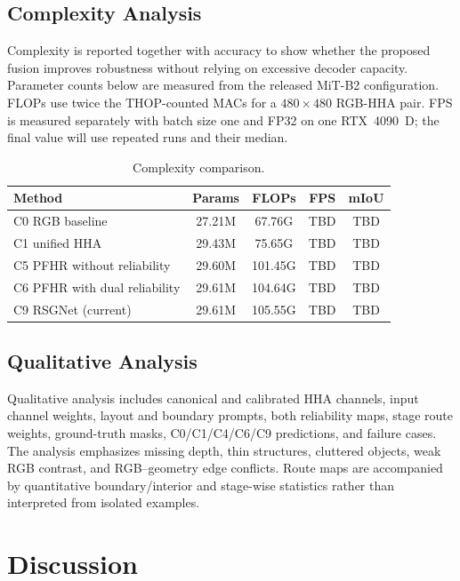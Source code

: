 \documentclass[a4paper,fleqn]{cas-dc}
\begin{document}
\subsection{Complexity Analysis}

Complexity is reported together with accuracy to show whether the proposed fusion improves robustness without relying on excessive decoder capacity. Parameter counts below are measured from the released MiT-B2 configuration. FLOPs use twice the THOP-counted MACs for a $480\times480$ RGB-HHA pair. FPS is measured separately with batch size one and FP32 on one RTX~4090~D; the final value will use repeated runs and their median.

\begin{table}%
\caption{Complexity comparison.}\label{tab:complexity}
\begin{tabular*}{\tblwidth}{@{\extracolsep{\fill}}lcccc@{}}
\toprule
Method & Params & FLOPs & FPS & mIoU \\
\midrule
C0 RGB baseline & 27.21M & 67.76G & TBD & TBD \\
C1 unified HHA & 29.43M & 75.65G & TBD & TBD \\
C5 PFHR without reliability & 29.60M & 101.45G & TBD & TBD \\
C6 PFHR with dual reliability & 29.61M & 104.64G & TBD & TBD \\
C9 RSGNet (current) & 29.61M & 105.55G & TBD & TBD \\
\bottomrule
\end{tabular*}
\end{table}

\subsection{Qualitative Analysis}

Qualitative analysis includes canonical and calibrated HHA channels, input channel weights, layout and boundary prompts, both reliability maps, stage route weights, ground-truth masks, C0/C1/C4/C6/C9 predictions, and failure cases. The analysis emphasizes missing depth, thin structures, cluttered objects, weak RGB contrast, and RGB--geometry edge conflicts. Route maps are accompanied by quantitative boundary/interior and stage-wise statistics rather than interpreted from isolated examples.

\section{Discussion}\label{sec:discussion}
\end{document}
